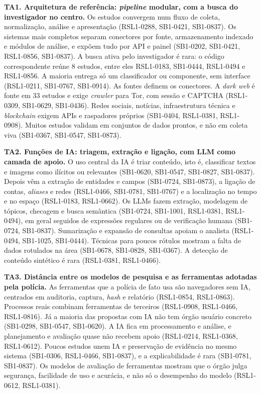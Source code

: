 

\textbf{TA1. Arquitetura de referência: \textit{pipeline} modular, com a
busca do investigador no centro.} Os estudos convergem num fluxo de coleta,
normalização, análise e apresentação (RSL1-0288, SB1-0421, SB1-0837). Os
sistemas mais completos separam conectores por fonte, armazenamento indexado
e módulos de análise, e expõem tudo por API e painel (SB1-0202, SB1-0421,
RSL1-0856, SB1-0837). A busca ativa pelo investigador é rara: o código
correspondente reúne 8 estudos, entre eles RSL1-0183, SB1-0444, RSL1-0494 e
RSL1-0856. A maioria entrega só um classificador ou componente, sem
interface (RSL1-0211, SB1-0767, SB1-0914). As fontes definem os conectores.
A \textit{dark web} é fonte em 33 estudos e exige \textit{crawler} para Tor,
com sessão e CAPTCHA (RSL1-0309, SB1-0629, SB1-0436). Redes sociais,
notícias, infraestrutura técnica e \textit{blockchain} exigem APIs e
raspadores próprios (SB1-0404, RSL1-0381, RSL1-0908). Muitos estudos validam
em conjuntos de dados prontos, e não em coleta viva (SB1-0367, SB1-0547,
SB1-0873).

\textbf{TA2. Funções de IA: triagem, extração e ligação, com LLM como camada
de apoio.} O uso central da IA é triar conteúdo, isto é, classificar textos e
imagens como ilícitos ou relevantes (SB1-0620, SB1-0547, SB1-0827, SB1-0837).
Depois vêm a extração de entidades e campos (SB1-0724, SB1-0873), a ligação
de contas, \textit{aliases} e redes (RSL1-0466, SB1-0781, SB1-0767) e a
localização no tempo e no espaço (RSL1-0183, RSL1-0662). Os LLMs fazem
extração, modelagem de tópicos, checagem e busca semântica (SB1-0724,
SB1-1001, RSL1-0381, RSL1-0494), em geral seguidos de expressões regulares
ou de verificação humana (SB1-0724, SB1-0837). Sumarização e expansão de
consultas apoiam o analista (RSL1-0494, SB1-1025, SB1-0444). Técnicas para
poucos rótulos mostram a falta de dados rotulados na área (SB1-0678,
SB1-0828, SB1-0367). A detecção de conteúdo sintético é rara (RSL1-0381,
RSL1-0466).

\textbf{TA3. Distância entre os modelos de pesquisa e as ferramentas
adotadas pela polícia.} As ferramentas que a polícia de fato usa são
navegadores sem IA, centrados em auditoria, captura, \textit{hash} e
relatório (RSL1-0854, RSL1-0863). Processos reais combinam ferramentas de
terceiros (RSL1-0908, RSL1-0466, RSL1-0816). Já a maioria das propostas com
IA não tem órgão usuário concreto (SB1-0298, SB1-0547, SB1-0620). A IA fica
em processamento e análise, e planejamento e avaliação quase não recebem
apoio (RSL1-0214, RSL1-0368, RSL1-0612). Poucos estudos unem IA e
preservação de evidência no mesmo sistema (SB1-0306, RSL1-0466, SB1-0837), e
a explicabilidade é rara (SB1-0781, SB1-0837). Os modelos de avaliação de
ferramentas mostram que o órgão julga segurança, facilidade de uso e
acurácia, e não só o desempenho do modelo (RSL1-0612, RSL1-0381).

